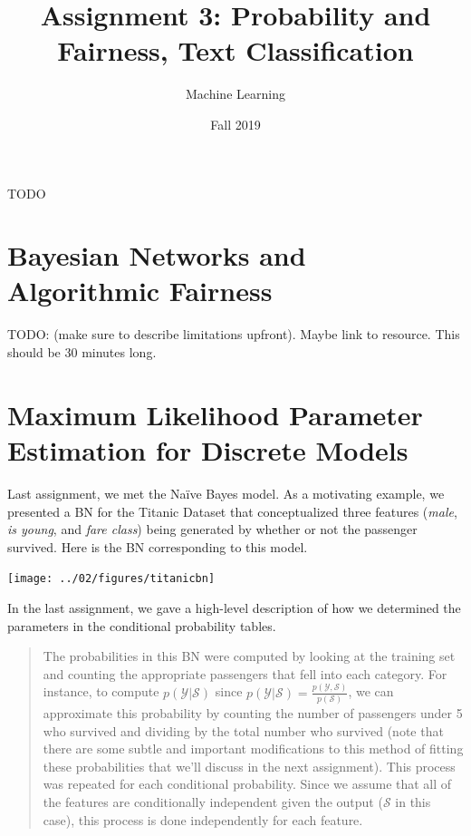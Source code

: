 \documentclass[assignment03_Solutions]{subfiles}
\title{Assignment 3: Probability and Fairness, Text Classification}
\author{Machine Learning}
\date{Fall 2019}
\begin{document}
\maketitle
\thispagestyle{firstpage}


\begin{learningobjectives}
\bi
\item TODO
\ei
\end{learningobjectives}

\section{Bayesian Networks and Algorithmic Fairness}

TODO: (make sure to describe limitations upfront).  Maybe link to resource.  This should be 30 minutes long.

\section{Maximum Likelihood Parameter Estimation for Discrete Models}
Last assignment, we met the Na\"ive Bayes model.  As a motivating example, we presented a BN for the Titanic Dataset that conceptualized three features (\emph{male}, \emph{is young}, and \emph{fare class}) being generated by whether or not the passenger survived.  Here is the BN corresponding to this model.

\begin{center}
\texttt{[image: ../02/figures/titanicbn]}
\end{center}

In the last assignment, we gave a high-level description of how we determined the parameters in the conditional probability tables.
\begin{quote}
The probabilities in this BN were computed by looking at the training set and counting the appropriate passengers that fell into each category.  For instance, to compute $p(\mathcal{Y}|\mathcal{S})$ since $p(\mathcal{Y}|\mathcal{S}) = \frac{p(\mathcal{Y}, \mathcal{S})}{p(\mathcal{S})}$, we can approximate this probability by counting the number of passengers under 5 who survived and dividing by the total number who survived (note that there are some subtle and important modifications to this method of fitting these probabilities that we'll discuss in the next assignment).  This process was repeated for each conditional probability.  Since we assume that all of the features are conditionally independent given the output ($\mathcal{S}$ in this case), this process is done independently for each feature.
\end{quote}
\end{document}
